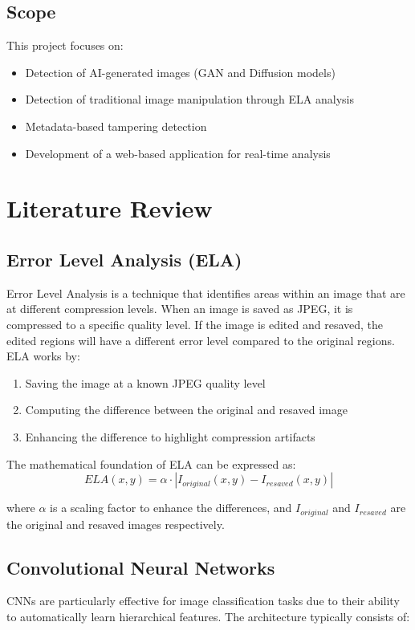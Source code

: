 \documentclass[12pt,a4paper]{article}
\begin{document}
\subsection{Scope}
This project focuses on:
\begin{itemize}
    \item Detection of AI-generated images (GAN and Diffusion models)
    \item Detection of traditional image manipulation through ELA analysis
    \item Metadata-based tampering detection
    \item Development of a web-based application for real-time analysis
\end{itemize}

\section{Literature Review}

\subsection{Error Level Analysis (ELA)}
Error Level Analysis is a technique that identifies areas within an image that are at different compression levels. When an image is saved as JPEG, it is compressed to a specific quality level. If the image is edited and resaved, the edited regions will have a different error level compared to the original regions. ELA works by:

\begin{enumerate}
    \item Saving the image at a known JPEG quality level
    \item Computing the difference between the original and resaved image
    \item Enhancing the difference to highlight compression artifacts
\end{enumerate}

The mathematical foundation of ELA can be expressed as:
\begin{equation}
ELA(x,y) = \alpha \cdot |I_{original}(x,y) - I_{resaved}(x,y)|
\end{equation}

where $\alpha$ is a scaling factor to enhance the differences, and $I_{original}$ and $I_{resaved}$ are the original and resaved images respectively.

\subsection{Convolutional Neural Networks}
CNNs are particularly effective for image classification tasks due to their ability to automatically learn hierarchical features. The architecture typically consists of:
\end{document}
